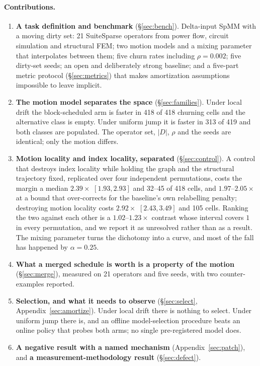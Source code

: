 \documentclass{article}
\begin{document}
\paragraph{Contributions.}
\begin{enumerate}
\itemsep2pt
\item \textbf{A task definition and benchmark} (\S\ref{sec:bench}). Delta-input
SpMM with a moving dirty set: 21 SuiteSparse operators from power flow, circuit
simulation and structural FEM; two motion models and a mixing parameter that
interpolates between them; five churn rates including $\rho{=}0.002$; five
dirty-set seeds; an open and deliberately strong baseline; and a five-part
metric protocol (\S\ref{sec:metrics}) that makes amortization assumptions
impossible to leave implicit.
\item \textbf{The motion model separates the space} (\S\ref{sec:families}).
Under local drift the block-scheduled arm is faster in 418 of 418 churning
cells and the alternative class is empty. Under uniform jump it is faster in 313
of 419 and both classes are populated. The operator set, $|D|$, $\rho$ and the
seeds are identical; only the motion differs.
\item \textbf{Motion locality and index locality, separated}
(\S\ref{sec:control}). A control that destroys index locality while holding the
graph and the structural trajectory fixed, replicated over four independent
permutations, costs the margin a median $2.39\times$ $[1.93, 2.93]$ and 32--45
of 418 cells, and $1.97$--$2.05\times$ at a bound that
over-corrects for the baseline's own relabelling penalty; destroying motion
locality costs $2.92\times$ $[2.43, 3.49]$ and 105 cells. Ranking the two
against each other is a $1.02$--$1.23\times$ contrast whose interval covers $1$
in every permutation, and we report it as unresolved rather than as a result. The mixing parameter
turns the dichotomy into a curve, and most of the fall has happened by
$\alpha{=}0.25$.
\item \textbf{What a merged schedule is worth is a property of the motion}
(\S\ref{sec:merge}), measured on 21 operators and five seeds, with two
counter-examples reported.
\item \textbf{Selection, and what it needs to observe} (\S\ref{sec:select},
Appendix~\ref{sec:amortize}). Under local drift there is nothing to select. Under
uniform jump there is, and an offline model-selection procedure beats an online
policy that probes both arms; no single pre-registered model does.
\item \textbf{A negative result with a named mechanism} (Appendix~\ref{sec:patch}), and
\textbf{a measurement-methodology result} (\S\ref{sec:defect}).
\end{enumerate}
\end{document}
